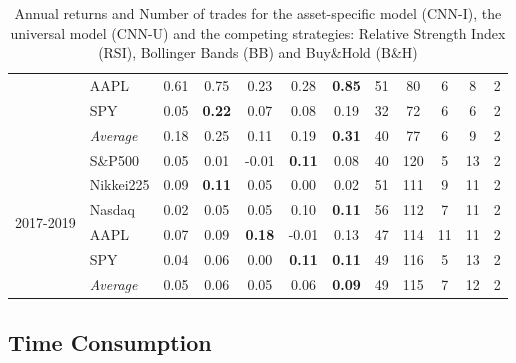 \documentclass[11pt, a4paper]{article}
\begin{document}
\begin{table}[H]
\begin{tabular}{l|l|ccccc|ccccc}
  & AAPL        & 0.61          & 0.75          & 0.23          & 0.28          & \textbf{0.85} & 51               & 80    & 6   & 8  & 2    \\
  & SPY           & 0.05          & \textbf{0.22} & 0.07          & 0.08          & 0.19          & 32               & 72    & 6   & 6  & 2    \\ \cline{2-12}
  & \textit{Average} & 0.18          & 0.25          & 0.11          & 0.19          & \textbf{0.31} & 40               & 77    & 6   & 9  & 2    \\ \hline
\multirow{6}{1cm}{2017-2019} & S\&P500       & 0.05          & 0.01          & -0.01         & \textbf{0.11} & 0.08          & 40               & 120   & 5   & 13 & 2    \\
  & Nikkei225     & 0.09          & \textbf{0.11} & 0.05          & 0.00          & 0.02          & 51               & 111   & 9   & 11 & 2    \\
  & Nasdaq         & 0.02          & 0.05          & 0.05          & 0.10          & \textbf{0.11} & 56               & 112   & 7   & 11 & 2    \\
  & AAPL      & 0.07          & 0.09          & \textbf{0.18} & -0.01         & 0.13          & 47               & 114   & 11  & 11 & 2    \\
  & SPY       & 0.04          & 0.06          & 0.00          & \textbf{0.11} & \textbf{0.11} & 49               & 116   & 5   & 13 & 2    \\ \cline{2-12}
  & \textit{Average} & 0.05          & 0.06          & 0.05          & 0.06          & \textbf{0.09} & 49               & 115   & 7   & 12 & 2   
\end{tabular}
\caption{Annual returns and Number of trades for the asset-specific model (CNN-I), the universal model (CNN-U) and the competing strategies: Relative Strength Index (RSI), Bollinger Bands (BB) and Buy\&Hold (B\&H)}
\label{tbl:FinResMain}
\end{table}

\subsection{Time Consumption}
\label{subsec:ER:TimePerf}
\end{document}
